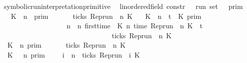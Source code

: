 \begin{isabellebody}
\isanewline
\isanewline
{}\isamarkupfalse%
\ symbolic{\isacharunderscore}run{\isacharunderscore}interpretation{\isacharunderscore}primitive\isanewline
\ \ {\isacharcolon}{\isacharcolon}{\isacartoucheopen}{\isacharparenleft}{\isacharprime}{\isasymtau}{\isacharcolon}{\isacharcolon}linordered{\isacharunderscore}field{\isacharparenright}\ constr\ {\isasymRightarrow}\ {\isacharprime}{\isasymtau}\ run\ set{\isacartoucheclose}\ {\isacharparenleft}{\isacartoucheopen}{\isasymlbrakk}\ {\isacharunderscore}\ {\isasymrbrakk}\isactrlsub p\isactrlsub r\isactrlsub i\isactrlsub m{\isacartoucheclose}{\isacharparenright}\isanewline
{}\isanewline
\ \ {\isacartoucheopen}{\isasymlbrakk}\ K\ {\isasymUp}\ n\ \ {\isasymrbrakk}\isactrlsub p\isactrlsub r\isactrlsub i\isactrlsub m\ \ \ \ \ {\isacharequal}\ {\isacharbraceleft}{\isasymrho}{\isachardot}\ ticks\ {\isacharparenleft}{\isacharparenleft}Rep{\isacharunderscore}run\ {\isasymrho}{\isacharparenright}\ n\ K{\isacharparenright}\ {\isacharbraceright}{\isacartoucheclose}\isanewline
{\isacharbar}\ {\isacartoucheopen}{\isasymlbrakk}\ K\ {\isacharat}\ n\ {\isasymoplus}\ {\isasymdelta}t\ {\isasymRightarrow}\ K{\isacharprime}\ {\isasymrbrakk}\isactrlsub p\isactrlsub r\isactrlsub i\isactrlsub m\ {\isacharequal}\isanewline
\ \ \ \ \ \ \ \ \ \ \ \ \ \ \ \ \ \ {\isacharbraceleft}{\isasymrho}{\isachardot}\ {\isasymforall}n\ {\isasymge}\ n\ first{\isacharunderscore}time\ {\isasymrho}\ K\ n\ {\isacharparenleft}time\ {\isacharparenleft}{\isacharparenleft}Rep{\isacharunderscore}run\ {\isasymrho}{\isacharparenright}\ n\ K{\isacharparenright}\ {\isacharplus}\ {\isasymdelta}t{\isacharparenright}\isanewline
\ \ \ \ \ \ \ \ \ \ \ \ \ \ \ \ \ \ \ \ \ \ \ \ \ \ \ \ \ \ \ {\isasymlongrightarrow}\ ticks\ {\isacharparenleft}{\isacharparenleft}Rep{\isacharunderscore}run\ {\isasymrho}{\isacharparenright}\ n\ K{\isacharprime}{\isacharparenright}{\isacharbraceright}{\isacartoucheclose}\isanewline
{\isacharbar}\ {\isacartoucheopen}{\isasymlbrakk}\ K\ {\isasymnot}{\isasymUp}\ n\ {\isasymrbrakk}\isactrlsub p\isactrlsub r\isactrlsub i\isactrlsub m\ \ \ \ \ {\isacharequal}\ {\isacharbraceleft}{\isasymrho}{\isachardot}\ {\isasymnot}ticks\ {\isacharparenleft}{\isacharparenleft}Rep{\isacharunderscore}run\ {\isasymrho}{\isacharparenright}\ n\ K{\isacharparenright}\ {\isacharbraceright}{\isacartoucheclose}\isanewline
{\isacharbar}\ {\isacartoucheopen}{\isasymlbrakk}\ K\ {\isasymnot}{\isasymUp}\ {\isacharless}\ n\ {\isasymrbrakk}\isactrlsub p\isactrlsub r\isactrlsub i\isactrlsub m\ \ \ {\isacharequal}\ {\isacharbraceleft}{\isasymrho}{\isachardot}\ {\isasymforall}i\ {\isacharless}\ n{\isachardot}\ {\isasymnot}\ ticks\ {\isacharparenleft}{\isacharparenleft}Rep{\isacharunderscore}run\ {\isasymrho}{\isacharparenright}\ i\ K{\isacharparenright}{\isacharbraceright}{\isacartoucheclose}\isanewline

\end{isabellebody}
